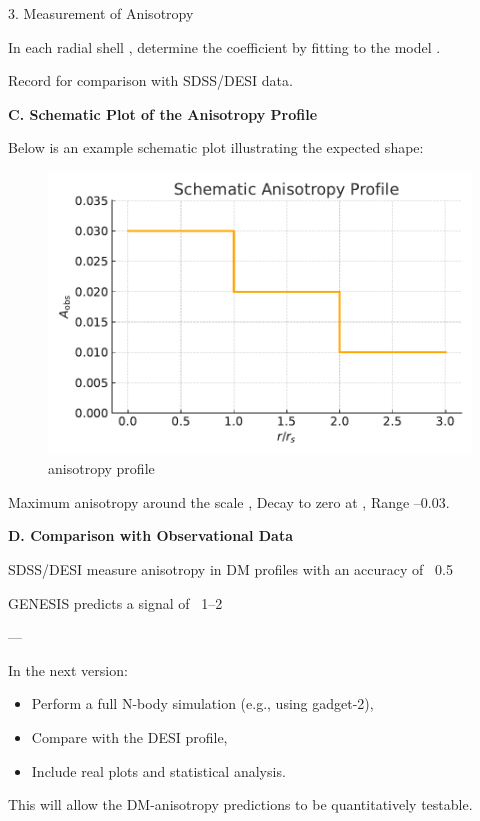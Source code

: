 \documentclass{article}
\begin{document}
3. Measurement of Anisotropy

In each radial shell , determine the coefficient  by fitting to the model .

Record  for comparison with SDSS/DESI data.

\textbf{C. Schematic Plot of the Anisotropy Profile}

Below is an example schematic plot illustrating the expected shape:

\begin{figure}
    \centering
    \includegraphics[width=0.5\linewidth]{AnisotropyProfile_EN.pdf}
    \caption{anisotropy profile}
    \label{fig:enter-label}
\end{figure}

Maximum anisotropy around the scale ,  
Decay to zero at ,  
Range –0.03.  

\textbf{D. Comparison with Observational Data}

SDSS/DESI measure anisotropy in DM profiles with an accuracy of ~0.5%

GENESIS predicts a signal of ~1–2%

---

In the next version:

\begin{itemize}
  \item Perform a full N-body simulation (e.g., using gadget-2),  
  \item Compare  with the DESI profile,  
  \item Include real plots and statistical analysis.  
\end{itemize}

This will allow the DM-anisotropy predictions to be quantitatively testable.

\medskip
\begin{center}
\end{center}
\medskip
\end{document}
